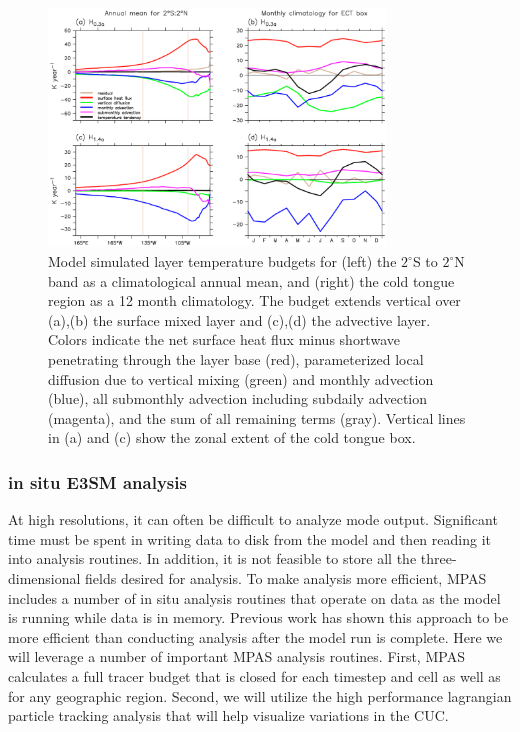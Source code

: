 \begin{figure}[h]
  \centering
  \includegraphics[width=0.8\textwidth]{heatbudget.eps}
  \caption{Model simulated layer temperature budgets for (left) the $2^\circ$S to $2^\circ$N band as a climatological annual mean, and (right) the cold tongue region as a 12 month climatology.  The budget extends vertical over (a),(b) the surface mixed layer and (c),(d) the advective layer.  Colors indicate the net surface heat flux minus shortwave penetrating through the layer base (red), parameterized local diffusion due to vertical mixing (green) and monthly advection (blue), all submonthly advection including subdaily advection (magenta), and the sum of all remaining terms (gray).  Vertical lines in (a) and (c) show the zonal extent of the cold tongue box.}
  \label{fig:heatBudget}
\end{figure}

\subsubsection{in situ E3SM analysis}
At high resolutions, it can often be difficult to analyze mode output.  Significant time must be spent in writing data to disk from the model and then reading it into analysis routines.  In addition, it is not feasible to store all the three-dimensional fields desired for analysis.  To make analysis more efficient, MPAS includes a number of in situ analysis routines that operate on data as the model is running while data is in memory.  Previous work \citep{woodring2015situ} has shown this approach to be more efficient than conducting analysis after the model run is complete.  Here we will leverage a number of important MPAS analysis routines.  First, MPAS calculates a full tracer budget that is closed for each timestep and cell as well as for any geographic region.  Second, we will utilize the high performance lagrangian particle tracking analysis \citep{wolfram2015diagnosing} that will help visualize variations in the CUC.

